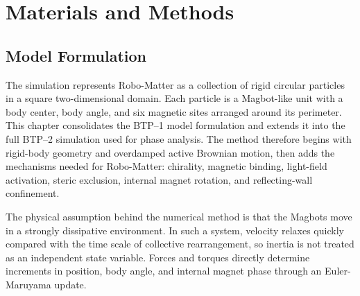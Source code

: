 \documentclass[12pt,a4paper,oneside]{report}
\begin{document}
\chapter{Materials and Methods}

\section{Model Formulation}
The simulation represents Robo-Matter as a collection of rigid circular particles in a square two-dimensional domain. Each particle is a Magbot-like unit with a body center, body angle, and six magnetic sites arranged around its perimeter. This chapter consolidates the BTP--1 model formulation and extends it into the full BTP--2 simulation used for phase analysis. The method therefore begins with rigid-body geometry and overdamped active Brownian motion, then adds the mechanisms needed for Robo-Matter: chirality, magnetic binding, light-field activation, steric exclusion, internal magnet rotation, and reflecting-wall confinement.

The physical assumption behind the numerical method is that the Magbots move in a strongly dissipative environment. In such a system, velocity relaxes quickly compared with the time scale of collective rearrangement, so inertia is not treated as an independent state variable. Forces and torques directly determine increments in position, body angle, and internal magnet phase through an Euler-Maruyama update.
\end{document}
